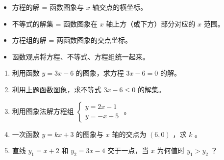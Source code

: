 \begin{keytakeaway}


\begin{itemize}
  \item 方程的解 = 函数图象与 $x$ 轴交点的横坐标。
  \item 不等式的解集 = 函数图象在 $x$ 轴上方（或下方）部分对应的 $x$ 范围。
  \item 方程组的解 = 两函数图象的交点坐标。
  \item 函数观点将方程、不等式、方程组统一起来。
\end{itemize}


\end{keytakeaway}

\begin{practice}


\begin{enumerate}
  \item 利用函数 $y = 3x - 6$ 的图象，求方程 $3x - 6 = 0$ 的解。
  \item 利用上题函数图象，求不等式 $3x - 6 \leq 0$ 的解集。
  \item 利用图象法解方程组 $\begin{cases} y = 2x - 1 \\ y = -x + 5 \end{cases}$ 。
  \item 一次函数 $y = kx + 3$ 的图象与 $x$ 轴的交点为 $(6, 0)$ ，求 $k$ 。
  \item 直线 $y_1 = x + 2$ 和 $y_2 = 3x - 4$ 交于一点，当 $x$ 为何值时 $y_1 > y_2$ ？
\end{enumerate}


\end{practice}



